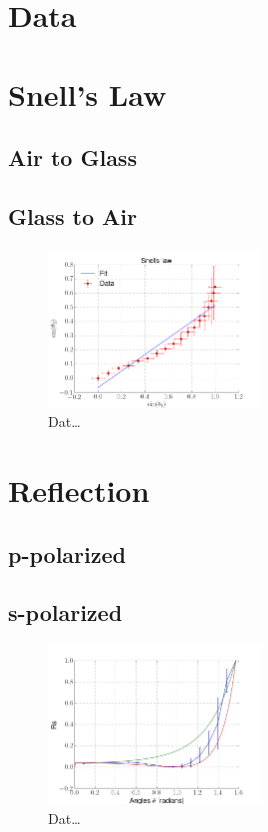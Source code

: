 \section{Data}
\section{Snell's Law}
\subsection{Air to Glass}

\subsection{Glass to Air}

\begin{figure}[h]
    \centering
    \includegraphics[width=0.5\textwidth]{snell}
    \caption{Dat\ldots}
    \label{fig:fit}
\end{figure}

\section{Reflection}
\subsection{p-polarized}
\subsection{s-polarized}
\begin{figure}[h]
    \centering
    \includegraphics[width=0.5\textwidth]{reflection}
    \caption{Dat\ldots}
    \label{fig:reflection}
\end{figure}



